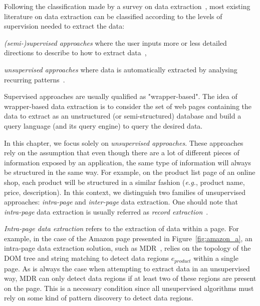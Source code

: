 Following the classification made by a survey on data extraction~\cite{Chang2006ASystems}, most existing literature on data extraction can be classified according to the levels of supervision needed to extract the data:
\begin{compactitem}
    \item \emph{(semi-)supervised approaches} where the user inputs more or less detailed directions to describe to how to extract data~\cite{Barish2000TheaterLoc:Applications,Huang2000ExtractingWEB,Levy1996QueryingDescriptions,Muslea1999ExtractionSurvey,Gottlob2004Logic-basedExtraction,Gottlob2004MonadicExtraction,Hsu1998GeneratingWeb},
    \item \emph{unsupervised approaches} where data is automatically extracted by analysing recurring patterns~\cite{Crescenzi2001RoadRunner:Sites,ArasuExtractingPages,Liu2003MiningPages,Wang2002WrapperDiscovery,Wang2002WrapperDiscovery}.
\end{compactitem}

Supervised approaches are usually qualified as "wrapper-based".
The idea of wrapper-based data extraction is to consider the set of web pages containing the data to extract as an unstructured (or semi-structured) database and build a query language (and its query engine) to query the desired data.

In this chapter, we focus solely on \emph{unsupervised approaches}.
These approaches rely on the assumption that even though there are a lot of different pieces of information exposed by an application, the same type of information will always be structured in the same way.
For example, on the product list page of an online shop, each product will be structured in a similar fashion (\emph{e.g.}, product name, price, description).
In this context, we distinguish two families of unsupervised approaches: \emph{intra-page} and \emph{inter-page} data extraction.
One should note that \emph{intra-page} data extraction is usually referred as \emph{record extraction}~\cite{Chang2006ASystems,DeReis2004AutomaticDistance}. 

\emph{Intra-page data extraction} refers to the extraction of data within a page.
For example, in the case of the Amazon page presented in Figure~\ref{fig:amazon_a}, an intra-page data extraction solution, such as MDR~\cite{Liu2003MiningPages}, relies on the topology of the DOM tree and string matching to detect data regions $\hat{e}_{product}$ within a single page.
As is always the case when attempting to extract data in an unsupervised way, MDR can only detect data regions if at least two of these regions are present on the page.
This is a necessary condition since all unsupervised algorithms must rely on some kind of pattern discovery to detect data regions.

